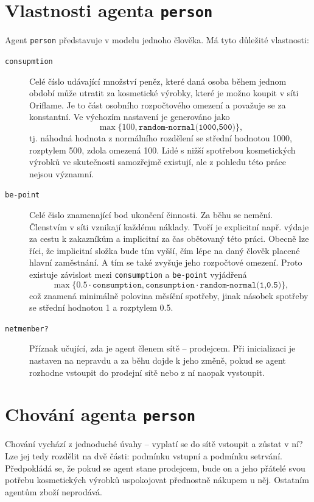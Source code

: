 \documentclass[a4wide,12pt]{report}
\begin{document}
\section{Vlastnosti agenta \texttt{person}}
\label{sec:vl_agenta}
Agent \texttt{person} představuje v modelu jednoho člověka. Má tyto důležité vlastnosti:
\begin{description}
\item[\texttt{consupmtion}] Celé číslo udávající množství peněz, které daná osoba během jednom období může utratit za kosmetické výrobky, které je možno koupit v síti Oriflame. Je to část osobního rozpočtového omezení a považuje se za konstantní. Ve výchozím nastavení je generováno jako
$$\max\{100,\texttt{random-normal(1000,500)}\},$$
tj. náhodná hodnota z normálního rozdělení se střední hodnotou 1000, rozptylem 500, zdola omezená 100. Lidé s nižší spotřebou kosmetických výrobků ve skutečnosti samozřejmě existují, ale z pohledu této práce nejsou významní.
\item[\texttt{be-point}] Celé čislo znamenající bod ukončení činnosti. Za běhu se nemění. Členstvím v síti vznikají každému náklady. Tvoří je explicitní např. výdaje za cestu k zakazníkům a implicitní za čas obětovaný této práci. Obecně lze říci, že implicitní složka bude tím vyš\-ší, čím lépe na daný člověk placené hlavní zaměstnání. A tím se také zvyšuje jeho rozpočtové omezení. Proto existuje závislost mezi \texttt{consumption} a \texttt{be-point} vyjádřená
$$\max\{0.5\cdot\texttt{consumption},\texttt{consumption}\cdot\texttt{random-normal(1,0.5)}\},$$
což znamená minimálně polovina měsíční spotřeby, jinak násobek spotřeby se střední hodnotou 1 a rozptylem 0.5.
\item[\texttt{netmember?}] Příznak učující, zda je agent členem sítě -- prodejcem. Při inicializaci je nastaven na nepravdu a za běhu dojde k jeho změně, pokud se agent rozhodne vstoupit do prodejní sítě nebo z ní naopak vystoupit.
\end{description}
\section{Chování agenta \texttt{person}}
Chování vychází z jednoduché úvahy -- vyplatí se do sítě vstoupit a zůstat v ní? Lze jej tedy rozdělit na dvě části: podmínku vstupní a podmínku setrvání. Předpokládá se, že pokud se agent stane prodejcem, bude on a jeho přátelé svou potřebu kosmetických výrobků uspokojovat přednostně nákupem u něj. Ostatním agentům zboží neprodává.
\end{document}
